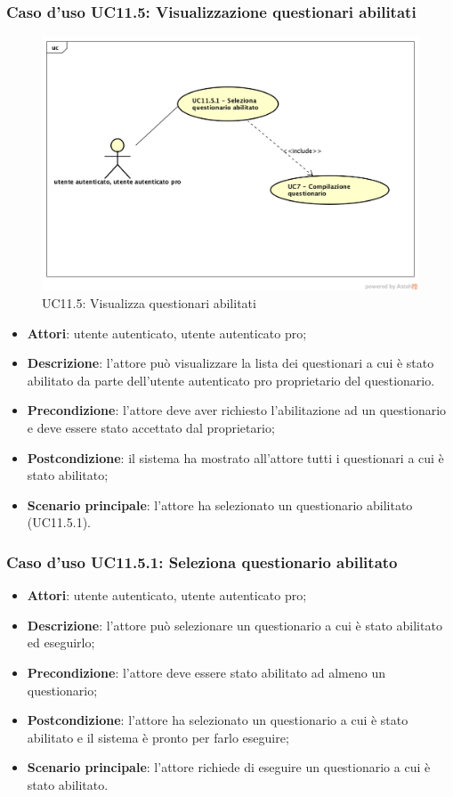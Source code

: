 \subsubsection{Caso d'uso UC11.5: Visualizzazione questionari abilitati}
\label{UC11.5}
\begin{figure}[h]
	\centering
	\includegraphics[scale=0.5]{UML/UC11_5.png}
	\caption{UC11.5: Visualizza questionari abilitati}
\end{figure}
\begin{itemize}
\item\textbf{Attori}: utente autenticato, utente autenticato pro;
\item\textbf{Descrizione}: l'attore può visualizzare la lista dei questionari a cui è stato abilitato da parte dell'utente autenticato pro proprietario del questionario.
\item\textbf{Precondizione}: l'attore deve aver richiesto l'abilitazione ad un questionario e deve essere stato accettato dal proprietario;
\item\textbf{Postcondizione}: il sistema ha mostrato all'attore tutti i questionari a cui è stato abilitato;
\item\textbf{Scenario principale}: l'attore ha selezionato un questionario abilitato (UC11.5.1).
\end{itemize}

\subsubsection{Caso d'uso UC11.5.1: Seleziona questionario abilitato}
\begin{itemize}
\item\textbf{Attori}: utente autenticato, utente autenticato pro;
\item\textbf{Descrizione}: l'attore può selezionare un questionario a cui è stato abilitato ed eseguirlo;
\item\textbf{Precondizione}: l'attore deve essere stato abilitato ad almeno un questionario;
\item\textbf{Postcondizione}: l'attore ha selezionato un questionario a cui è stato abilitato e il sistema è pronto per farlo eseguire;
\item\textbf{Scenario principale}: l'attore richiede di eseguire un questionario a cui è stato abilitato.
\end{itemize}

